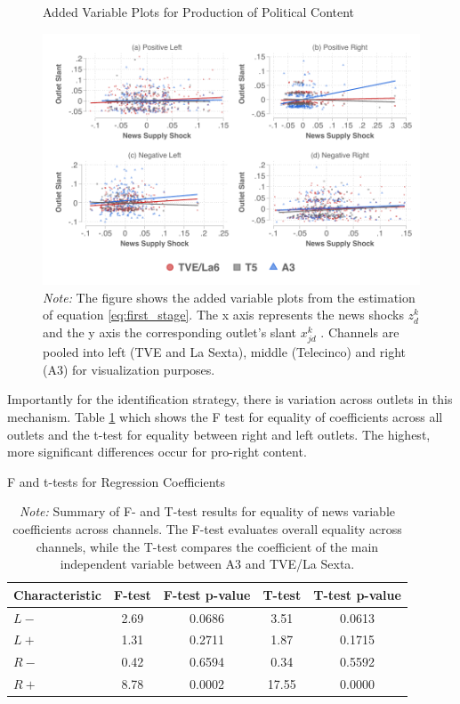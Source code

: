 \documentclass[12pt]{article}
\begin{document}
 
	
	
		\begin{figure}[!htb]
		\centering
\caption{Added Variable Plots for Production of Political Content}
		\includegraphics[width=160mm]{figures/fwl_plots_v2}
		\caption*{\small \textit{Note:} The figure shows the added variable plots from the estimation of equation \ref{eq:first_stage}. The x axis represents the news shocks $z_d^k $ and the y axis the corresponding outlet's slant $x_{jd}^k $   . Channels are pooled into left (TVE and La Sexta), middle (Telecinco) and right (A3) for visualization purposes.  }
		\label{fig:fwl}
	\end{figure}
	
	Importantly for the identification strategy, there is variation across outlets in this mechanism. Table \ref{tab:tests}  which shows the F test for equality of coefficients across all outlets and the t-test for equality between right and left outlets. The highest, more significant differences occur for pro-right content.
	
	
	
	\begin{table}[!htbp]
		\centering
	

		\caption{F and t-tests for Regression Coefficients}
		\begin{tabular}{lcccc}
			\hline
			Characteristic & F-test  & F-test p-value & T-test  & T-test p-value \\
			\hline
			$ {L-}$& 2.69 & 0.0686 & 3.51  & 0.0613 \\
			$ {L+}$ & 1.31 & 0.2711 & 1.87  & 0.1715 \\
			$ {R-}$ & 0.42 & 0.6594 & 0.34 & 0.5592 \\
$ {R+}$ & 8.78 & 0.0002 & 17.55  & 0.0000 \\
			\hline
		\end{tabular}
			\caption*{\small \textit{Note:} Summary of F- and T-test results for equality of news variable coefficients across channels. The F-test evaluates overall equality across channels, while the T-test compares the coefficient of the main independent variable between A3 and TVE/La Sexta.}
					\label{tab:tests}
	\end{table}
	
\end{document}
